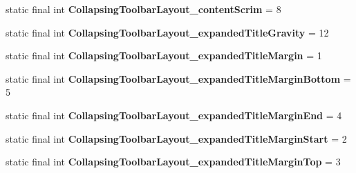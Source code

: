 \begin{DoxyCompactItemize}
\item 
\hypertarget{classandroid_1_1support_1_1design_1_1_r_1_1styleable_ac385082b349bba84c2cbce41cc926062}{}static final int {\bfseries Collapsing\+Toolbar\+Layout\+\_\+content\+Scrim} = 8\label{classandroid_1_1support_1_1design_1_1_r_1_1styleable_ac385082b349bba84c2cbce41cc926062}

\item 
\hypertarget{classandroid_1_1support_1_1design_1_1_r_1_1styleable_a22ca6e930c13beba31f8d203d3fe975c}{}static final int {\bfseries Collapsing\+Toolbar\+Layout\+\_\+expanded\+Title\+Gravity} = 12\label{classandroid_1_1support_1_1design_1_1_r_1_1styleable_a22ca6e930c13beba31f8d203d3fe975c}

\item 
\hypertarget{classandroid_1_1support_1_1design_1_1_r_1_1styleable_a94ebf42f82b453a27b237b0bebf8ae72}{}static final int {\bfseries Collapsing\+Toolbar\+Layout\+\_\+expanded\+Title\+Margin} = 1\label{classandroid_1_1support_1_1design_1_1_r_1_1styleable_a94ebf42f82b453a27b237b0bebf8ae72}

\item 
\hypertarget{classandroid_1_1support_1_1design_1_1_r_1_1styleable_a6b5972f1871c56095c3fd4dfd0d87d48}{}static final int {\bfseries Collapsing\+Toolbar\+Layout\+\_\+expanded\+Title\+Margin\+Bottom} = 5\label{classandroid_1_1support_1_1design_1_1_r_1_1styleable_a6b5972f1871c56095c3fd4dfd0d87d48}

\item 
\hypertarget{classandroid_1_1support_1_1design_1_1_r_1_1styleable_abf4153c9e38ee5d38f3f60f9ce772c61}{}static final int {\bfseries Collapsing\+Toolbar\+Layout\+\_\+expanded\+Title\+Margin\+End} = 4\label{classandroid_1_1support_1_1design_1_1_r_1_1styleable_abf4153c9e38ee5d38f3f60f9ce772c61}

\item 
\hypertarget{classandroid_1_1support_1_1design_1_1_r_1_1styleable_afd17a6349c12e66bd2ec7543b8aea927}{}static final int {\bfseries Collapsing\+Toolbar\+Layout\+\_\+expanded\+Title\+Margin\+Start} = 2\label{classandroid_1_1support_1_1design_1_1_r_1_1styleable_afd17a6349c12e66bd2ec7543b8aea927}

\item 
\hypertarget{classandroid_1_1support_1_1design_1_1_r_1_1styleable_ac20bf3c3187cbfe0e8d3d38f0f240bc7}{}static final int {\bfseries Collapsing\+Toolbar\+Layout\+\_\+expanded\+Title\+Margin\+Top} = 3\label{classandroid_1_1support_1_1design_1_1_r_1_1styleable_ac20bf3c3187cbfe0e8d3d38f0f240bc7}


\end{DoxyCompactItemize}
